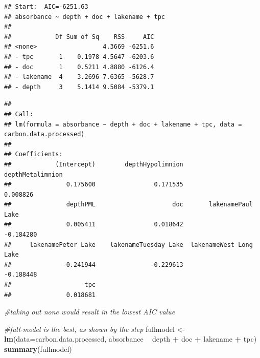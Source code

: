 \documentclass[12pt,]{article}
\newenvironment{Shaded}{\begin{snugshade}}{\end{snugshade}}
\newcommand{\KeywordTok}[1]{\textcolor[rgb]{0.13,0.29,0.53}{\textbf{#1}}}
\newcommand{\DataTypeTok}[1]{\textcolor[rgb]{0.13,0.29,0.53}{#1}}
\newcommand{\StringTok}[1]{\textcolor[rgb]{0.31,0.60,0.02}{#1}}
\newcommand{\CommentTok}[1]{\textcolor[rgb]{0.56,0.35,0.01}{\textit{#1}}}
\newcommand{\OperatorTok}[1]{\textcolor[rgb]{0.81,0.36,0.00}{\textbf{#1}}}
\newcommand{\NormalTok}[1]{#1}
\begin{document}
\begin{verbatim}
## Start:  AIC=-6251.63
## absorbance ~ depth + doc + lakename + tpc
## 
##            Df Sum of Sq    RSS     AIC
## <none>                  4.3669 -6251.6
## - tpc       1    0.1978 4.5647 -6203.6
## - doc       1    0.5211 4.8880 -6126.4
## - lakename  4    3.2696 7.6365 -5628.7
## - depth     3    5.1414 9.5084 -5379.1
\end{verbatim}

\begin{verbatim}
## 
## Call:
## lm(formula = absorbance ~ depth + doc + lakename + tpc, data = carbon.data.processed)
## 
## Coefficients:
##            (Intercept)        depthHypolimnion        depthMetalimnion  
##               0.175600                0.171535                0.008826  
##               depthPML                     doc       lakenamePaul Lake  
##               0.005411                0.018642               -0.184280  
##     lakenamePeter Lake    lakenameTuesday Lake  lakenameWest Long Lake  
##              -0.241944               -0.229613               -0.188448  
##                    tpc  
##               0.018681
\end{verbatim}

\begin{Shaded}
\begin{Highlighting}[]
\CommentTok{#taking out none would result in the lowest AIC value}

\CommentTok{#full-model is the best, as shown by the step }
\NormalTok{fullmodel <-}\StringTok{ }\KeywordTok{lm}\NormalTok{(}\DataTypeTok{data=}\NormalTok{carbon.data.processed, absorbance }\OperatorTok{~}\StringTok{ }\NormalTok{depth }\OperatorTok{+}\StringTok{ }\NormalTok{doc  }\OperatorTok{+}\StringTok{ }\NormalTok{lakename }\OperatorTok{+}\StringTok{ }\NormalTok{tpc)}
\KeywordTok{summary}\NormalTok{(fullmodel)}
\end{Highlighting}
\end{Shaded}
\end{document}
